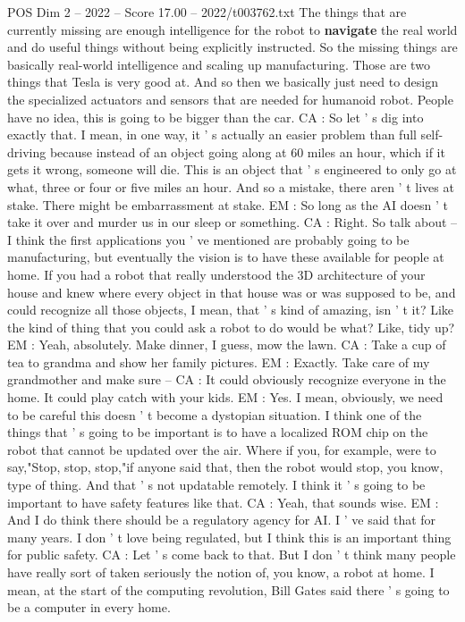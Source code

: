 \begin{textsample}{POS Dim 2 – 2022 – Score 17.00 – 2022/t003762.txt}
The things that are currently missing are enough intelligence for the robot to \textbf{navigate} the real world and do useful things without being explicitly instructed.
So the missing things are basically real-world intelligence and scaling up manufacturing.
Those are two things that Tesla is very good at.
And so then we basically just need to design the specialized actuators and sensors that are needed for humanoid robot.
People have no idea, this is going to be bigger than the car.
CA : So let ' s dig into exactly that.
I mean, in one way, it ' s actually an easier problem than full self-driving because instead of an object going along at 60 miles an hour, which if it gets it wrong, someone will die.
This is an object that ' s engineered to only go at what, three or four or five miles an hour.
And so a mistake, there aren ' t lives at stake.
There might be embarrassment at stake.
EM : So long as the AI doesn ' t take it over and murder us in our sleep or something.
CA : Right.
So talk about -- I think the first applications you ' ve mentioned are probably going to be manufacturing, but eventually the vision is to have these available for people at home.
If you had a robot that really understood the 3D architecture of your house and knew where every object in that house was or was supposed to be, and could recognize all those objects, I mean, that ' s kind of amazing, isn ' t it?
Like the kind of thing that you could ask a robot to do would be what?
Like, tidy up?
EM : Yeah, absolutely.
Make dinner, I guess, mow the lawn.
CA : Take a cup of tea to grandma and show her family pictures.
EM : Exactly.
Take care of my grandmother and make sure -- CA : It could obviously recognize everyone in the home.
It could play catch with your kids.
EM : Yes.
I mean, obviously, we need to be careful this doesn ' t become a dystopian situation.
I think one of the things that ' s going to be important is to have a localized ROM chip on the robot that cannot be updated over the air.
Where if you, for example, were to say,"Stop, stop, stop,"if anyone said that, then the robot would stop, you know, type of thing.
And that ' s not updatable remotely.
I think it ' s going to be important to have safety features like that.
CA : Yeah, that sounds wise.
EM : And I do think there should be a regulatory agency for AI.
I ' ve said that for many years.
I don ' t love being regulated, but I think this is an important thing for public safety.
CA : Let ' s come back to that.
But I don ' t think many people have really sort of taken seriously the notion of, you know, a robot at home.
I mean, at the start of the computing revolution, Bill Gates said there ' s going to be a computer in every home.

\end{textsample}
